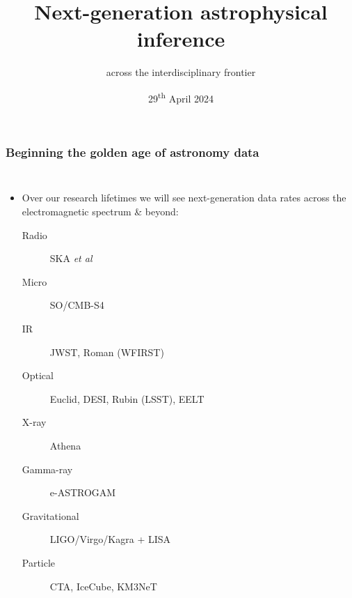 \documentclass[aspectratio=169]{beamer}
\title{Next-generation astrophysical inference}
\subtitle{across the interdisciplinary frontier}
\date{29\textsuperscript{th} April 2024}
\begin{document}
\begin{frame}
    \titlepage
\end{frame}

\begin{frame}
    \frametitle{Beginning the golden age of astronomy data}
    \begin{columns}
        \begin{itemize}
            \item Over our research lifetimes we will see next-generation data rates across the electromagnetic spectrum \& beyond:
                \begin{description}
                    \item[Radio] SKA \textit{et al}
                    \item[Micro] SO/CMB-S4
                    \item[IR] JWST, Roman (WFIRST)
                    \item[Optical] Euclid, DESI, Rubin (LSST), EELT
                    \item[X-ray] Athena
                    \item[Gamma-ray] e-ASTROGAM
                    \item[Gravitational] LIGO/Virgo/Kagra + LISA
                    \item[Particle] CTA, IceCube, KM3NeT
                \end{description}
        \end{itemize}


\end{columns}
\end{frame}
\end{document}
